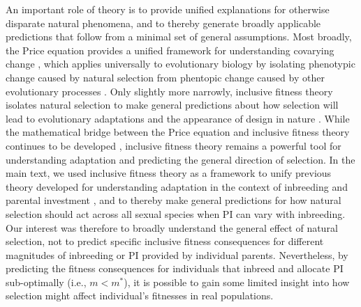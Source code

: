 \documentclass[12pt]{article}
\begin{document}
\clearpage

\noindent An important role of theory is to provide unified explanations for otherwise disparate natural phenomena, and to thereby generate broadly applicable predictions that follow from a minimal set of general assumptions. Most broadly, the Price equation provides a unified framework for understanding covarying change \cite[][]{Price1970}, which applies universally to evolutionary biology by isolating phenotypic change caused by natural selection from phentopic change caused by other evolutionary processes \cite[][]{Gardner2008}. Only slightly more narrowly, inclusive fitness theory isolates natural selection to make general predictions about how selection will lead to evolutionary adaptations and the appearance of design in nature \cite[][]{Gardner2014}. While the mathematical bridge between the Price equation and inclusive fitness theory continues to be developed \cite[][]{Grafen2006, Grafen2014b}, inclusive fitness theory remains a powerful tool for understanding adaptation and predicting the general direction of selection. In the main text, we used inclusive fitness theory as a framework to unify previous theory developed for understanding adaptation in the context of inbreeding \cite[][]{Parker1979, Parker2006} and parental investment \cite[e.g.,][]{Macnair1978, Parker1978}, and to thereby make general predictions for how natural selection should act across all sexual species when PI can vary with inbreeding. Our interest was therefore to broadly understand the general effect of natural selection, not to predict specific inclusive fitness consequences for different magnitudes of inbreeding or PI provided by individual parents. Nevertheless, by predicting the fitness consequences for individuals that inbreed and allocate PI sub-optimally (i.e., $m < m^{*}$), it is possible to gain some limited insight into how selection might affect individual's fitnesses in real populations. 
\end{document}
